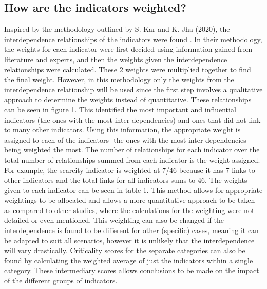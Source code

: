 \documentclass{article}
\begin{document}
\subsection{How are the indicators weighted?}

Inspired by the methodology outlined by S. Kar and K. Jha (2020), the interdependence relationships of the indicators were found \cite{doi:10.1080/15623599.2020.1742637}. In their methodology, the weights for each indicator were first decided using information gained from literature and experts, and then the weights given the interdependence relationships were calculated. These 2 weights were multiplied together to find the final weight. However, in this methodology only the weights from the interdependence relationship will be used since the first step involves a qualitative approach to determine the weights instead of quantitative. These relationships can be seen in figure 1. This identified the most important and influential indicators (the ones with the most inter-dependencies) and ones that did not link to many other indicators. Using this information, the appropriate weight is assigned to each of the indicators- the ones with the most inter-dependencies being weighted the most. The number of relationships for each indicator over the total number of relationships summed from each indicator is the weight assigned. For example, the scarcity indicator is weighted at 7/46 because it has 7 links to other indicators and the total links for all indicators sums to 46. The weights given to each indicator can be seen in table 1. This method allows for appropriate weightings to be allocated and allows a more quantitative approach to be taken as compared to other studies, where the calculations for the weighting were not detailed or even mentioned. This weighting can also be changed if the interdependence is found to be different for other (specific) cases, meaning it can be adapted to suit all scenarios, however it is unlikely that the interdependence will vary drastically. Criticality scores for the separate categories can also be found by calculating the weighted average of just the indicators within a single category. These intermediary scores allows conclusions to be made on the impact of the different groups of indicators. 
\end{document}
